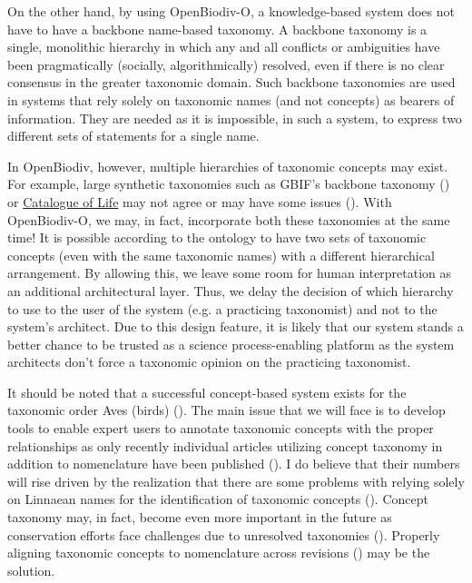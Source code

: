 On the other hand, by using \mbox{OpenBiodiv-O}, a knowledge-based system does not have to have a backbone name-based taxonomy. A backbone taxonomy is a single, monolithic hierarchy in which any and all conflicts or ambiguities have been pragmatically (socially, algorithmically) resolved, even if there is no clear consensus in the greater taxonomic domain. Such backbone taxonomies are used in systems that rely solely on taxonomic names (and not concepts) as bearers of information. They are needed as it is impossible, in such a system, to express two different sets of statements for a single name.

In OpenBiodiv, however, multiple hierarchies of taxonomic concepts may exist. For example, large synthetic taxonomies such as GBIF's backbone taxonomy (\cite{gbif_secretariat_gbif_2017}) or \href{http://www.catalogueoflife.org/}{Catalogue of Life} may not agree or may have some issues (\cite{page_gbif_2012}). With OpenBiodiv-O, we may, in fact, incorporate both these taxonomies at the same time! It is possible according to the ontology to have two sets of taxonomic concepts (even with the same taxonomic names) with a different hierarchical arrangement. By allowing this, we leave some room for human interpretation as an additional architectural layer. Thus, we delay the decision of which hierarchy to use to the user of the system (e.g. a practicing taxonomist) and not to the system's architect. Due to this design feature, it is likely that our system stands a better chance to be trusted as a science process-enabling platform as the system architects don't force a taxonomic opinion on the practicing taxonomist.

It should be noted that a successful concept-based system exists for the taxonomic order Aves (birds) (\cite{lepage_avibase_2014}). The main issue that we will face is to develop tools to enable expert users to annotate taxonomic concepts with the proper relationships as only recently individual articles utilizing concept taxonomy in addition to nomenclature have been published (\cite{franz_two_2016,jansen_phylogenetic_2015,franz_three_2017}). I do believe that their numbers will rise driven by the realization that there are some problems with relying solely on Linnaean names for the identification of taxonomic concepts (\cite{patterson_names_2010,remsen_use_2016, franz_names_2016}). Concept taxonomy may, in fact, become even more important in the future as conservation efforts face challenges due to unresolved taxonomies (\cite{garnett_taxonomy_2017}). Properly aligning taxonomic concepts to nomenclature across revisions (\cite{franz_logic_2016-1}) may be the solution.

